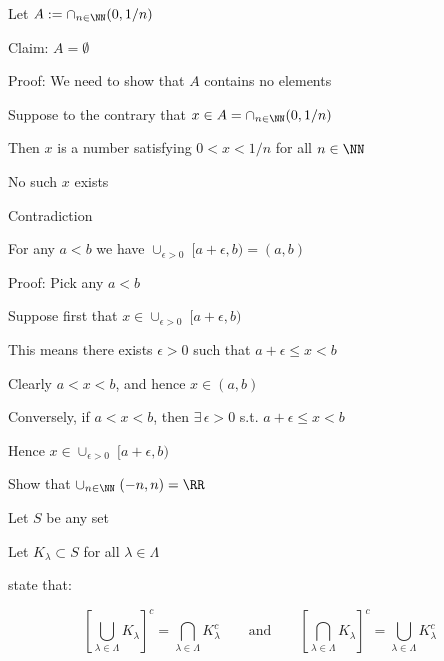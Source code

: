 \begin{frame}

    \Eg Let $A := \cap_{n \in \NN} (0, 1/n)$

    \vspace{1em}

    Claim: $A = \emptyset$ 

    \vspace{1em}

    Proof: We need to show that $A$ contains no elements
    
    Suppose to the contrary that $x \in A = \cap_{n \in \NN} (0, 1/n)$
    
    Then $x$ is a number satisfying $0 < x < 1/n$ for all $n \in \NN$ 

    No such $x$ exists

    Contradiction

\end{frame}


\begin{frame}
    

    \Eg For any $a < b$ we have $\cup_{\epsilon > 0 } \; [a + \epsilon, b) = (a, b)$ 

    \vspace{1em}

    Proof: Pick any $a < b$ 
    
    Suppose first that $x \in \cup_{\epsilon > 0 } \; [a + \epsilon, b)$

    This means there exists $\epsilon > 0$ such that $a + \epsilon \leq x < b$

    Clearly $a < x < b$, and hence $x \in (a, b)$

    Conversely, if $a < x < b$, then $\exists \, \epsilon > 0$ s.t. $a +
    \epsilon \leq x < b$

    Hence $x \in \cup_{\epsilon > 0 } \; [a + \epsilon, b)$

    \vspace{1em}


    \Ex Show that $\cup_{n \in \NN}\;  (-n, n) = \RR$ 

\end{frame}


\begin{frame}

    Let $S$ be any set

    Let $K_{\lambda} \subset S$ for all $\lambda \in \Lambda$
    
     state that:
    
    \begin{equation*}
        \left[ \bigcup_{\lambda \in \Lambda} K_{\lambda}  \right]^{c}  =
            \bigcap_{\lambda \in \Lambda} K_{\lambda}^{c}
            \qquad \text{and} \qquad
        \left[ \bigcap_{\lambda \in \Lambda}
            K_{\lambda}  \right]^{c}  = \bigcup_{\lambda \in \Lambda} K_{\lambda}^{c}
    \end{equation*}
    
\end{frame}


